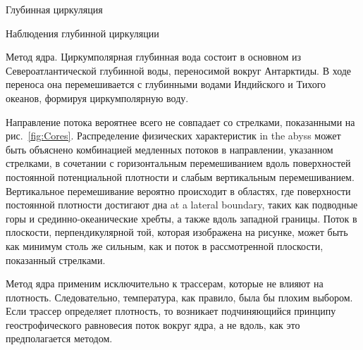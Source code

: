 \begin{chapter}{Глубинная циркуляция}
\begin{section}{Наблюдения глубинной циркуляции}
\begin{paragraph}{Метод ядра.}
Циркумполярная глубинная вода 
состоит в основном из Североатлантической глубинной воды, переносимой вокруг 
Антарктиды. В ходе переноса она перемешивается с глубинными водами Индийского
и Тихого океанов, формируя циркумполярную воду.
%

Направление потока вероятнее всего не совпадает со стрелками, показанными
на рис.~\ref{fig:Cores}. Распределение физических характеристик 
in the abyss может быть объяснено комбинацией медленных потоков
в направлении, указанном стрелками, в сочетании с горизонтальным 
перемешиванием вдоль 
поверхностей постоянной потенциальной плотности и слабым вертикальным 
перемешиванием. Вертикальное 
перемешивание вероятно происходит
в областях, где поверхности постоянной плотности достигают дна
at a lateral boundary, таких как подводные горы и срединно-океанические хребты,
а также вдоль западной границы. Поток в плоскости, перпендикулярной той, 
которая изображена на рисунке, может быть как минимум столь же сильным, как
и поток в рассмотренной плоскости, показанный стрелками.
%

Метод ядра применим исключительно к трассерам, которые не
влияют на плотность. Следовательно, температура, как правило, была бы плохим
выбором. Если трассер определяет плотность, то возникает подчиняющийся 
принципу геострофического равновесия поток вокруг ядра, а не вдоль, как это 
предполагается методом.
%


\end{paragraph}
\end{section}
\end{chapter}
